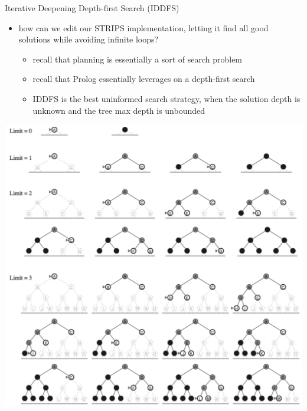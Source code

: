 \documentclass[presentation]{beamer}\mode<presentation>{\usetheme{AMSBolognaFC}}
\begin{document}
\begin{frame}[c,allowframebreaks]{Iterative Deepening Depth-first Search (IDDFS)}

    \begin{itemize}
        \item how can we edit our STRIPS implementation, letting it find \alert{all} good solutions while avoiding infinite loops?
        \begin{itemize}
            \item recall that planning is essentially a sort of \alert{search} problem
            \item recall that Prolog essentially leverages on a \alert{depth-first} search
            \item IDDFS is the best \alert{uninformed} search strategy, when the solution depth is unknown and the tree max depth is unbounded
        \end{itemize}
    \end{itemize}

\framebreak

\begin{center}
	\includegraphics[width=.6\linewidth]{./figures/iddfs.png}
\end{center}


\end{frame}
\end{document}

